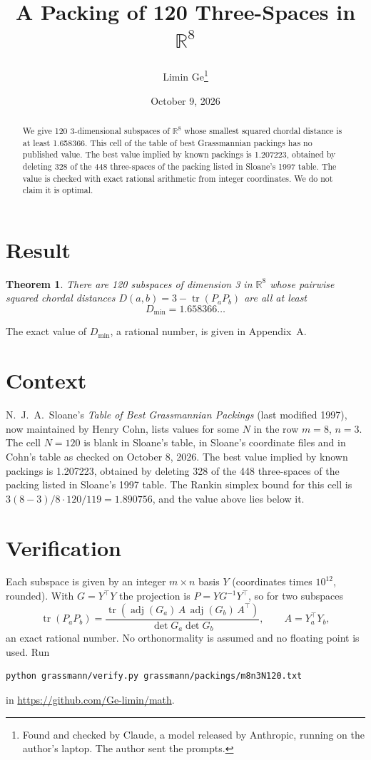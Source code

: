 \documentclass[11pt,a4paper]{article}
\title{A Packing of 120 Three-Spaces in $\mathbb{R}^{8}$}
\author{Limin Ge\thanks{Found and checked by Claude, a model released by Anthropic, running on the author's laptop. The author sent the prompts.}}
\date{October 9, 2026}
\newtheorem*{theorem}{Theorem}
\begin{document}
\maketitle
\begin{abstract}
We give 120 3-dimensional subspaces of $\mathbb{R}^{8}$ whose smallest squared chordal distance is at least 1.658366. This cell of the table of best Grassmannian packings has no published value. The best value implied by known packings is 1.207223, obtained by deleting 328 of the 448 three-spaces of the packing listed in Sloane's 1997 table. The value is checked with exact rational arithmetic from integer coordinates. We do not claim it is optimal.
\end{abstract}

\section{Result}
\begin{theorem}
There are 120 subspaces of dimension 3 in $\mathbb{R}^{8}$ whose pairwise squared chordal distances $D(a,b) = 3 - \operatorname{tr}(P_aP_b)$ are all at least
\[ D_{\min} = 1.658366\ldots \]
\end{theorem}
The exact value of $D_{\min}$, a rational number, is given in Appendix~A.


\section{Context}
N.~J.~A.~Sloane's \emph{Table of Best Grassmannian Packings} (last modified 1997), now maintained by Henry Cohn, lists values for some $N$ in the row $m=8$, $n=3$. The cell $N=120$ is blank in Sloane's table, in Sloane's coordinate files and in Cohn's table as checked on October 8, 2026. The best value implied by known packings is 1.207223, obtained by deleting 328 of the 448 three-spaces of the packing listed in Sloane's 1997 table. The Rankin simplex bound for this cell is $3(8-3)/8\cdot 120/119 = 1.890756$, and the value above lies below it.


\section{Verification}
Each subspace is given by an integer $m\times n$ basis $Y$ (coordinates times $10^{12}$, rounded). With $G=Y^\top Y$ the projection is $P=YG^{-1}Y^\top$, so for two subspaces
\[ \operatorname{tr}(P_aP_b)=\frac{\operatorname{tr}(\operatorname{adj}(G_a)\,A\,\operatorname{adj}(G_b)\,A^\top)}{\det G_a\det G_b},\qquad A=Y_a^\top Y_b, \]
an exact rational number. No orthonormality is assumed and no floating point is used. Run
\begin{verbatim}
python grassmann/verify.py grassmann/packings/m8n3N120.txt
\end{verbatim}
in \url{https://github.com/Ge-limin/math}.
\end{document}
